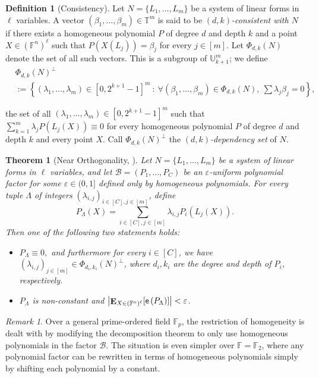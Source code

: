 \documentclass{article}
\theoremstyle{plain}
\newtheorem{thm}[theorem]{Theorem}
\theoremstyle{definition}
\newtheorem{definition}[theorem]{Definition}
\theoremstyle{definition}
\theoremstyle{remark}
\newtheorem*{rem}{Remark}
\numberwithin{equation}{section}
\newcommand{\FF}{\mathbb{F}}
\newcommand{\T}{\mathbb{T}}
\newcommand{\UU}{\mathbb{U}}
\newcommand{\Esymb}{{\bf E}}
\DeclareMathOperator*{\E}{\Esymb}
\newcommand{\cB}{\mathcal B}
\newcommand{\expo}[1]{{\mathsf{e}\left(#1\right)}}
\begin{document}
\begin{definition}[Consistency]\label{def:consistent}
Let $N=\{L_1,\dots,L_m\}$ be a system of linear forms in $\ell$ variables. A vector $(\beta_1, \dots, \beta_m) \in \T^m$ is said to be {\em $(d,k)$-consistent with $N$} if there exists a homogeneous polynomial $P$ of degree $d$ and depth $k$ and a point $X\in (\FF^n)^\ell$ such that $P(X(L_j))=\beta_j$ for every $j \in [m]$. Let $\Phi_{d,k}(N)$ denote the set of all such vectors. This is a subgroup of $\UU_{k+1}^m$; we define
\begin{align*}
    &\Phi_{d,k}(N)^\perp \\
    & := \left\{(\lambda_1,\ldots,\lambda_m) \in  [0,2^{k+1}-1]^m \ : \ \forall (\beta_1,\ldots,\beta_m) \in  \Phi_{d,k}(N), \ \sum \lambda_j \beta_j = 0   \right\},
\end{align*}

\noindent the set of all $(\lambda_1,\ldots,\lambda_m) \in [0,2^{k+1}-1]^m$ such that $\sum_{k=1}^m \lambda_j P(L_j(X)) \equiv 0$ for every homogeneous polynomial $P$ of degree $d$ and depth $k$ and every point $X$. Call $\Phi_{d,k}(N)^\perp$ the \emph{$(d,k)$-dependency set} of $N$.
\end{definition}

\begin{thm}[Near Orthogonality, {\cite[Theorem~3.7]{hatamiRegCount}}]\label{thm:nearOrtho}
Let $N=\{L_1,\dots,L_m\}$ be a system of linear forms in $\ell$ variables, and let $\cB=(P_1,\dots,P_C)$ be an $\varepsilon$-uniform polynomial factor for some $\varepsilon\in (0,1]$ defined only by homogeneous polynomials. For every tuple $\Lambda$ of integers $(\lambda_{i,j})_{i\in [C], j\in [m]}$, define 
$$
P_{\Lambda}(X)= \sum_{i\in [C], j\in [m]} \lambda_{i,j} P_i(L_j(X)).
$$
Then one of the following two statements holds: 
\begin{itemize}
\item $P_\Lambda \equiv 0,$ and furthermore for every $i \in [C]$, we have $(\lambda_{i,j})_{j \in [m]} \in \Phi_{d_i,k_i}(N)^\perp$, where $d_i,k_i$ are the degree and depth of $P_i$, respectively.
\item $P_\Lambda$ is non-constant and $\left| \E_{X\in (\FF^n)^\ell} [\expo{P_\Lambda}] \right|< \varepsilon$.
\end{itemize}
\end{thm}

\begin{rem}
Over a general prime-ordered field $\FF_p$, the restriction of homogeneity is dealt with by modifying the decomposition theorem to only use homogeneous polynomials in the factor $\cB$. The situation is even simpler over $\FF=\FF_2$, where any polynomial factor can be rewritten in terms of homogeneous polynomials simply by shifting each polynomial by a constant.
\end{rem}
\end{document}
